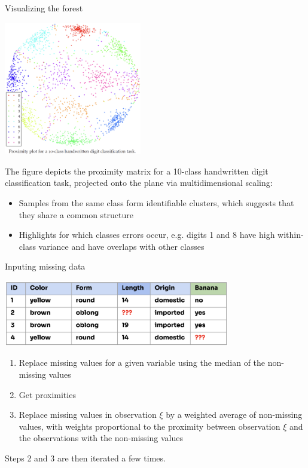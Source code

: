 \documentclass[11pt,compress,t,notes=noshow, xcolor=table]{beamer}
\begin{document}
\begin{vbframe}{Visualizing the forest}

\vspace{-2ex}
\begin{center}
\includegraphics[width=0.45\textwidth]{figure_man/forest-proximity_plot.png}
\end{center}
\vspace{-1ex}
{\small
The figure  depicts the proximity matrix for a 10-class handwritten digit classification task, projected onto the plane via multidimensional scaling:
\begin{itemize}
  \item Samples from the same class form identifiable clusters, which suggests that they share a common structure
  \item Highlights for which classes errors occur, e.g. digits 1 and 8 have high within-class variance and have overlaps with other classes 
\end{itemize}
}

\end{vbframe}

\begin{vbframe}{Inputing missing data}
\begin{center}
\includegraphics[width=0.74\textwidth]{figure_man/forest-missing_value.png}
\end{center}
\begin{enumerate}
\item Replace missing values for a given variable using the median of the non-missing values
\item Get proximities
\item Replace missing values in observation $\xi$ by a weighted average of non-missing values, with weights proportional to the proximity between observation $\xi$ and the observations with the non-missing values
\end{enumerate}
Steps 2 and 3 are then iterated a few times. %
\end{vbframe}
\end{document}
